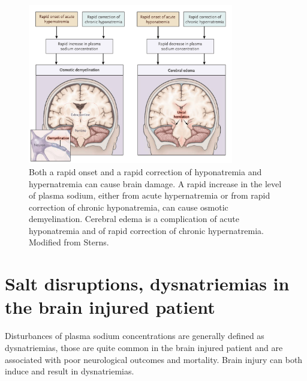 \begin{figure}[h]
    \centering
    \includegraphics[width=0.8\textwidth]{pictures/fig1.png}
    \caption{Both a rapid onset and a rapid correction of hyponatremia and hypernatremia can cause brain damage. A rapid increase in the level of plasma sodium, either from acute hypernatremia or from rapid correction of chronic hyponatremia, can cause osmotic demyelination. Cerebral edema is a complication of acute hyponatremia and of rapid correction of chronic hypernatremia. Modified from Sterns\cite{sternsDisordersPlasmaSodium2015a}.}
    \label{fig1}
\end{figure}

\section{Salt disruptions, dysnatriemias in the brain injured patient}
Disturbances of plasma sodium concentrations are generally defined as dysnatriemias, those are quite common in the brain injured patient and are associated with poor neurological outcomes and mortality. Brain injury can both induce and result in dysnatriemias.\\

